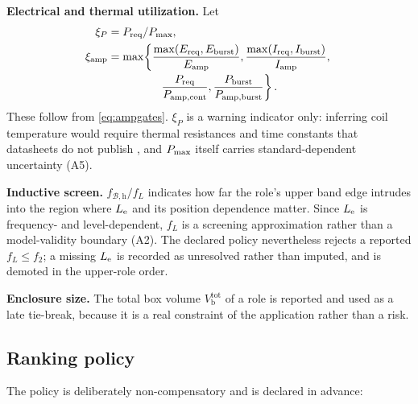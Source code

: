 \textbf{Electrical and thermal utilization.} Let
\begin{equation}
	\begin{aligned}
	\xi_P &={P_{\mathrm{req}}}/{P_{\mathrm{max}}},\\
	\xi_{\mathrm{amp}}&=\max\!\left\{
		\frac{\max(E_{\mathrm{req}},E_{\mathrm{burst}})}
		     {E_{\mathrm{amp}}},
		\frac{\max(I_{\mathrm{req}},I_{\mathrm{burst}})}
		     {I_{\mathrm{amp}}},\right.\\[-0.3ex]
	&\hspace{4.5em}\left.
		\frac{P_{\mathrm{req}}}{P_{\mathrm{amp,cont}}},
		\frac{P_{\mathrm{burst}}}{P_{\mathrm{amp,burst}}}
		\right\}.
	\end{aligned}
\end{equation}
These follow from \cref{eq:ampgates}. $\xi_P$ is a warning indicator only:
inferring coil temperature would require thermal resistances and time
constants that datasheets do not publish \cite{button1992}, and $P_{\mathrm{max}}$
itself carries standard-dependent uncertainty (A5).

\textbf{Inductive screen.} $f_{\mathcal B,\mathrm h}/f_L$ indicates how far the role's upper
band edge intrudes into the region where $L_{\mathrm{e}}$ and its position dependence
matter. Since $L_{\mathrm{e}}$ is frequency- and level-dependent, $f_L$ is a
screening approximation rather than a model-validity boundary (A2). The
declared policy nevertheless rejects a reported $f_L\le f_2$; a missing
$L_{\mathrm{e}}$ is recorded as unresolved rather than imputed, and is demoted in the
upper-role order.

\textbf{Enclosure size.} The total box volume $V_{\mathrm b}^{\mathrm{tot}}$
of a role is reported and used as a late tie-break, because it is a real
constraint of the application rather than a risk.

\subsection{Ranking policy}
\label{sec:risk-policy}

The policy is deliberately non-compensatory and is declared in advance:

